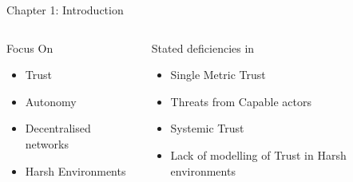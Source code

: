 \documentclass[aspectratio=43]{beamer}
\begin{document}
\begin{frame}{Chapter 1: Introduction}

  \begin{columns}
    \begin{column}{0.5\textwidth}
      \begin{block}{Focus On}
        \begin{itemize}
          \item Trust
          \item Autonomy
          \item Decentralised networks
          \item Harsh Environments
        \end{itemize}
      \end{block}
    \end{column}
    \begin{column}{0.5\textwidth}
      \begin{alertblock}{Stated deficiencies in}
        \begin{itemize}
          \item Single Metric Trust
          \item Threats from Capable actors
          \item Systemic Trust
          \item Lack of modelling of Trust in Harsh environments
        \end{itemize}
      \end{alertblock}
    \end{column}
  \end{columns}
\end{frame}
\end{document}
